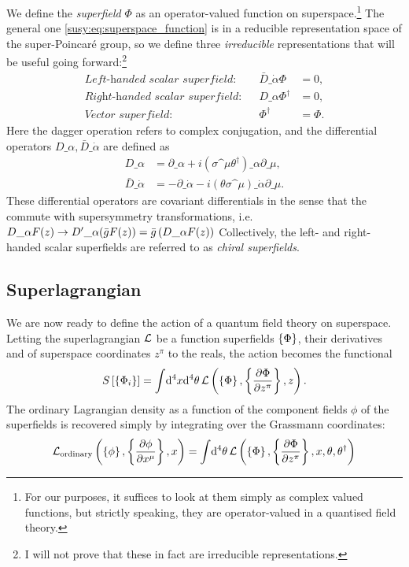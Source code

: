 \documentclass[../main.tex]{subfiles}
\begin{document}
We define the \emph{superfield} \(\Phi\) as an operator-valued function on
superspace.\footnote{For our purposes, it suffices to look at them simply as complex valued functions, but strictly speaking, they are operator-valued in a quantised field theory.} The general one \cref{susy:eq:superspace_function} is in a
reducible representation space of the super-Poincaré group, so we define three
\emph{irreducible} representations that will be useful going forward:\footnote{I will not prove that these in fact are irreducible representations.}
\begin{align}
  \textit{Left-handed scalar superfield:}  &  & \bar{D}\_{\dot\alpha}\Phi & = 0,    \\
  \textit{Right-handed scalar superfield:} &  & D\_{\alpha}\Phi^\dagger   & = 0,    \\
  \label{susy:eq:vector_superfield}
  \textit{Vector superfield:}              &  & \Phi^\dagger              & = \Phi.
\end{align}
Here the dagger operation refers to complex conjugation, and the differential operators \(D\_\alpha, \bar{D}\_{\dot\alpha}\) are defined as
\begin{subequations}
  \begin{align}
    D\_\alpha             & = \partial\_\alpha + i(\sigma\^\mu \theta^\dagger)\_\alpha \partial\_\mu,      \\
    \bar{D}\_{\dot\alpha} & = -\partial\_{\dot\alpha} - i (\theta\sigma\^\mu)\_{\dot\alpha} \partial\_\mu.
  \end{align}
\end{subequations}
These differential operators are covariant differentials in the sense that the commute with supersymmetry transformations, i.e. \(D\_\alpha F(z) \to {D^\prime}\_\alpha (\bar{g} F(z)) = \bar{g} \pclosed{D\_\alpha F(z)}\)
Collectively, the left- and right-handed scalar superfields are referred to as \emph{chiral superfields}.

\subsection{Superlagrangian}
We are now ready to define the action of a quantum field theory on superspace.
Letting the superlagrangian \(\L\) be a function superfields \(\cclosed{\Phi}\), their derivatives and of superspace coordinates \(z^\pi\) to the reals, the action becomes the functional
\begin{equation}
  S\bclosed{\cclosed{\Phi_i}} = \integral{^4x \mathrm{d}^4\theta} \L\pclosed{\cclosed{\Phi}, \cclosed{\pd[z^\pi]{\Phi}}, z}.
\end{equation}
The ordinary Lagrangian density as a function of the component fields \(\phi\) of the superfields is recovered simply by integrating over the Grassmann coordinates:
\begin{equation}
  \L_\text{ordinary}\pclosed{\cclosed{\phi}, \cclosed{\pd[x^\mu]{\phi}}, x} = \integral{^4\theta} \L\pclosed{\cclosed{\Phi}, \cclosed{\pd[z^\pi]{\Phi}}, x, \theta, \theta^\dagger}
\end{equation}
\end{document}
